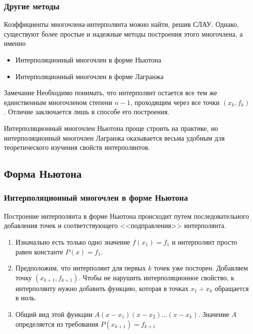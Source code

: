 \documentclass[aspectratio=43,unicode]{beamer}
\begin{document}
\begin{frame}
\frametitle{Другие методы}
	Коэффициенты многочлена-интерполянта можно найти, решив СЛАУ. Однако, существуют более
	простые и надежные методы построения этого многочлена, а именно
	\begin{itemize}
		\item Интерполяционный многочлен в форме Ньютона
		\item Интерполяционный многочлен в форме Лагранжа
	\end{itemize}
	\pause

	\begin{block}{Замечание}
	Необходимо понимать, что интерполянт остается все тем же единственным многочленом степени $n-1$,
	проходящим через все точки $(x_k, f_k)$. Отличие заключается лишь в способе его построения.
	\end{block}
	\pause

	Интерполяционный многочлен Ньютона проще строить на практике, но интерполяционный многочлен Лагранжа
	оказывается весьма удобным для теоретического изучения свойств интерполянтов.
\end{frame}

\subsection{Форма Ньютона}
\begin{frame}
\frametitle{Интерполяционный многочлен в форме Ньютона}
	Построение интерполянта в форме Ньютона происходит путем последовательного добавления точек и
	соответствующего <<подправления>> интерполянта.
	\begin{enumerate}
	\pause
	\item Изначально есть только одно значение $f(x_1) = f_1$ и интерполянт просто равен константе $P(x) = f_1$.
	\pause
	\item Предположим, что интерполянт для первых $k$ точек уже посторен. Добавляем точку $(x_{k+1}, f_{k+1})$.
	Чтобы не нарушить интерполяционное свойство, к интерполянту нужно добавить функцию, которая в точках $x_1 \div x_k$ обращается в ноль.
	\item Общий вид этой функции $A(x-x_1)(x-x_2)\dots(x-x_k)$. Значение $A$ определяется из требования $P(x_{k+1}) = f_{k+1}$
	\end{enumerate}
\end{frame}
\end{document}
